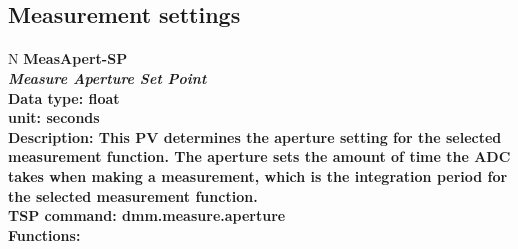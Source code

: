 \documentclass[openany]{article}
\begin{document}
	\subsection{Measurement settings}\label{pvgroup:meas-settings}

		\paragraph{} %

		\begin{tabular}{N}
			\hline
			\bfseries MeasApert-SP\label{pv:measapert-sp} \\ \hline
			\emph{Measure Aperture Set Point} \\
			Data type: float \\
			unit: seconds \\
			Description: This PV determines the aperture setting for the selected measurement function. The aperture sets the amount of time the ADC takes when making a measurement, which is the integration period for the selected measurement function. \\
			TSP command: dmm.measure.aperture \\
			Functions: \\
			\arrayrulecolor{\FuncTableBorderColor}

		\end{tabular}
\end{document}
